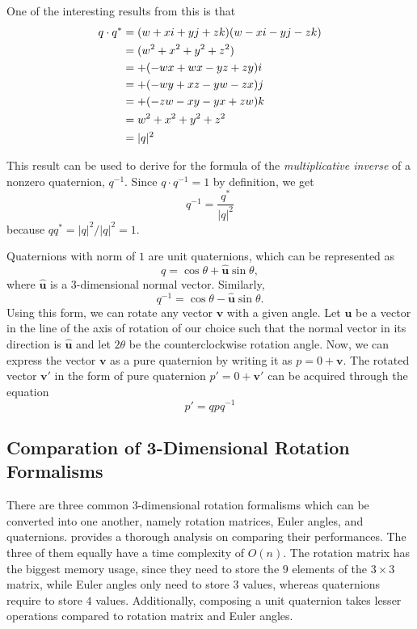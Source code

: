 \documentclass[conference]{IEEEtran}
\begin{document}
One of the interesting results from this is that
\begin{align}
    q \cdot q^* &= (w + xi + yj + zk)(w - xi - yj - zk) \notag \\
    &= (w^2 + x^2 + y^2 + z^2) \notag \\
    &= + (-wx + wx - yz + zy)i \notag \\
    &= + (-wy + xz - yw - zx)j \notag \\
    &= + (-zw - xy - yx + zw)k \notag \\
    &= w^2 + x^2 + y^2 + z^2 \notag \\
    &= |q|^2
\end{align}

This result can be used to derive for the formula of the \textit{multiplicative inverse} of a nonzero quaternion, $q^{-1}$. Since $q \cdot q^{-1} = 1$ by definition, we get
\begin{equation}
    q^{-1} = \frac{q^*}{|q|^2}
\end{equation}
because $qq^* = |q|^2/|q|^2 = 1$.

Quaternions with norm of $1$ are unit quaternions, which can be represented as
\begin{equation}
    q = \cos \theta + \hat{\mathbf{u}} \sin \theta,
\end{equation}
where $\hat{\mathbf{u}}$ is a 3-dimensional normal vector. Similarly,
\begin{equation}
    q^{-1} = \cos \theta - \hat{\mathbf{u}} \sin \theta.
\end{equation}
Using this form, we can rotate any vector $\mathbf{v}$ with a given angle. Let $\mathbf{u}$ be a vector in the line of the axis of rotation of our choice such that the normal vector in its direction is $\hat{\mathbf{u}}$ and let $2\theta$ be the counterclockwise rotation angle. Now, we can express the vector $\mathbf{v}$ as a pure quaternion by writing it as $p = 0 + \mathbf{v}$. The rotated vector $\mathbf{v'}$ in the form of pure quaternion $p' = 0 + \mathbf{v'}$ can be acquired through the equation
\begin{equation}
    p' = qpq^{-1}
\end{equation}

\subsection{Comparation of 3-Dimensional Rotation Formalisms}
There are three common 3-dimensional rotation formalisms which can be converted into one another, namely rotation matrices, Euler angles, and quaternions. \cite{rot} provides a thorough analysis on comparing their performances. The three of them equally have a time complexity of $O(n)$. The rotation matrix has the biggest memory usage, since they need to store the $9$ elements of the $3 \times 3$ matrix, while Euler angles only need to store $3$ values, whereas quaternions require to store $4$ values. Additionally, composing a unit quaternion takes lesser operations compared to rotation matrix and Euler angles.
\end{document}
